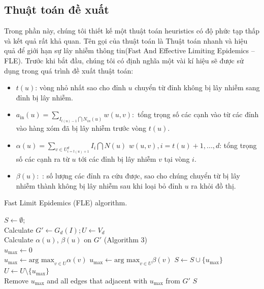 \subsection{Thuật toán đề xuất}
Trong phần này, chúng tôi thiết kế một thuật toán heuristics có độ phức tạp thấp và kết quả rất khả quan. Tên gọi của thuật toán là Thuật toán nhanh và hiệu quả để giới hạn sự lây nhiễm thông tin(Fast And Effective Limiting Epidemics – FLE). 
Trước khi bắt đầu, chúng tôi có định nghĩa một vài kí hiệu sẽ được sử dụng trong quá trình đề xuất thuật toán:
\begin {itemize}
\item $t(u)$: vòng nhỏ nhất sao cho đỉnh $u$ chuyển từ đỉnh không bị lây nhiễm sang đỉnh bị lây nhiễm.

\item $a_{\text{in}}(u) = \sum_{I_{t(u) - 1} \bigcap N_{in}(u)} w(u,v):$ tổng trọng số các cạnh vào từ các đỉnh vào hàng xóm đã bị lây nhiễm trước vòng $t(u)$.

\item $\alpha(u) = \sum_{v \in U^{d}_{i=t(u)+1}} I_{i} \bigcap N(u)$ $w(u,v), i = t(u) + 1, ... , d$: tổng trọng số các cạnh ra từ $u$ tới các đỉnh bị lây nhiễm $v$ tại vòng $i$.

\item $\beta(u): $ : số lượng các đỉnh ra cứu được, sao cho chúng chuyển từ bị lây nhiễm thành không bị lây nhiễm sau khi loại bỏ đỉnh $u$ ra khỏi đồ thị.
\end {itemize}
\begin{algorithm}[H]
	\caption{Fast Limit Epidemics (FLE) algorithm.}
	\label{alg:Algo1}
	$S \gets \emptyset$; 
	\\
	Calculate $G' \gets G_{d}(I); U \gets V_{d}$
	\\
	{
		Calculate $\alpha(u)$, $\beta(u)$ on $G'$ (Algorithm 3)
		\\
		$u_{\text{max}} \gets 0$
		\\
		{
			$u_{\text{max}} \gets \text{arg max}_{v \in U}\alpha(v)$
		}
		{
			$u_{\text{max}} \gets \text{arg max}_{v \in U}\beta(v)$
		}
		$S \gets S \cup \{u_{\text{max}}\}$
		\\
		$U \gets U \setminus \{u_{\text{max}}\}$
		\\
		Remove $u_{\text{max}}$ and all edges that adjacent with $u_{\text{max}}$ from $G'$
	}
	\Return $S$
\end{algorithm}

